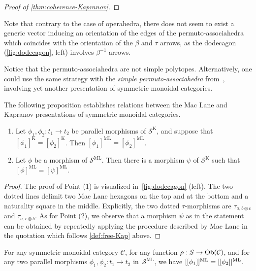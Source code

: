 {\begin{proof}[Proof of \cref{thm:coherence-Kapranov}]
\end{proof}
\begin{rem}
    Note that contrary to the case of operahedra, there does not seem to exist a generic vector inducing an orientation of the edges of the permuto-associahedra which coincides with the orientation of the $\beta$ and $\tau$ arrows, as the dodecagon (\cref{fig:dodecagon}, left) involves $\beta^{-1}$ arrows. 
\end{rem}
\begin{rem}
    Notice that the permuto-associahedra are not simple polytopes.
    Alternatively, one could use the same strategy with the \emph{simple permuto-associahedra} from~\cite{baralicSimplePermutoassociahedron2019}, involving yet another presentation of symmetric monoidal categories.
\end{rem}
The following proposition establishes relations between the Mac Lane and Kapranov presentations of symmetric monoidal categories.
\begin{proposition}
\label{Kapranov-MacLane}
\leavevmode
\begin{enumerate}
\item Let $\phi_1,\phi_2: t_1 \to t_2$  be parallel morphisms of $\mathcal{S}^{\mathrm{K}}$, and suppose that $[\phi_1]^{\mathrm{K}}=[\phi_2]^{\mathrm{K}}$. Then $[\phi_1]^{\mathrm{ML}}=[\phi_2]^{\mathrm{ML}}$.
\item Let $\phi$ be a morphism of $\mathcal{S}^{\mathrm{ML}}$. Then there is a morphism $\psi$ of 
$\mathcal{S}^{\mathrm{K}}$ such that $[\phi]^{\mathrm{ML}}=[\psi]^{\mathrm{ML}}$.
\end{enumerate}
\end{proposition}
\begin{proof}
The proof of Point (1) is visualized in~\cref{fig:dodecagon} (left).  
The two dotted lines delimit two Mac Lane hexagons on the top and at the bottom and a naturality square in the middle.
Explicitly, the two dotted $\tau$-morphisms are $\tau_{a,b\otimes c}$ and $\tau_{a,c\otimes b}$.  
As for Point (2), we observe that a morphism $\psi$ as in the statement can be obtained by repeatedly applying the procedure described by Mac Lane in the quotation which follows \cref{def:free-Kap} above.
\end{proof}
\begin{thm}
\label{thm:coherence-MacLane}
    For any symmetric monoidal category $\mathcal{C}$, for any  function $\rho : S \to \mathrm{Ob}(\mathcal{C})$, and for any two parallel morphisms $\phi_1,\phi_2: t_1 \to t_2$ in~$\mathcal{S}^{\mathrm{ML}}$, we have $[[\phi_1]]^{\mathrm{ML}}=[[\phi_2]]^{\mathrm{ML}}$.

\end{thm}}
